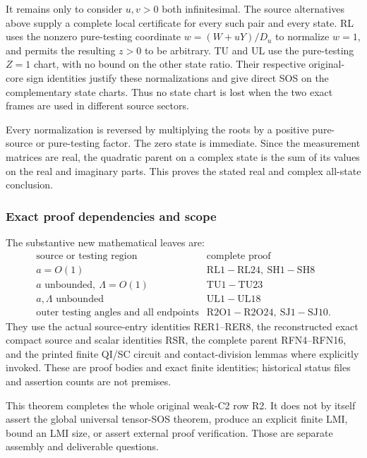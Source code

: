 It remains only to consider \(u,v>0\) both infinitesimal.
The source alternatives above supply a complete local certificate
for every such pair and every state.  RL uses the nonzero
pure-testing coordinate \(w=(W+uY)/D_u\) to normalize
\(w=1\), and permits the resulting \(z>0\) to be arbitrary.
TU and UL use the pure-testing \(Z=1\) chart, with no bound on
the other state ratio.  Their respective original-core sign
identities justify these normalizations and give direct SOS
on the complementary state charts.  Thus no state chart is
lost when the two exact frames are used in different source
sectors.

Every normalization is reversed by multiplying the roots by
a positive pure-source or pure-testing factor.  The zero
state is immediate.  Since the measurement matrices are real,
the quadratic parent on a complex state is the sum of its
values on the real and imaginary parts.  This proves the
stated real and complex all-state conclusion.

\subsubsection*{Exact proof dependencies and scope}

The substantive new mathematical leaves are:
\[
\begin{array}{c|l}
 \text{source or testing region}&\text{complete proof}\\ \hline
 a=O(1)&\mathrm{RL1\!-\!RL24,\ SH1\!-\!SH8}\\
 a\text{ unbounded},\ \Lambda=O(1)&\mathrm{TU1\!-\!TU23}\\
 a,\Lambda\text{ unbounded}&\mathrm{UL1\!-\!UL18}\\
 \text{outer testing angles and all endpoints}&
                   \mathrm{R2O1\!-\!R2O24,\ SJ1\!-\!SJ10}.
\end{array}                                                     \tag{R2A4}
\]
They use the actual source-entry identities RER1--RER8,
the reconstructed exact compact source and scalar identities
RSR, the complete parent RFN4--RFN16, and the printed finite
QI/SC circuit and contact-division lemmas where explicitly
invoked.  These are proof bodies and exact finite identities;
historical status files and assertion counts are not premises.

This theorem completes the whole original weak-C2 row R2.
It does not by itself assert the global universal tensor-SOS
theorem, produce an explicit finite LMI, bound an LMI size,
or assert external proof verification.  Those are separate
assembly and deliverable questions.


